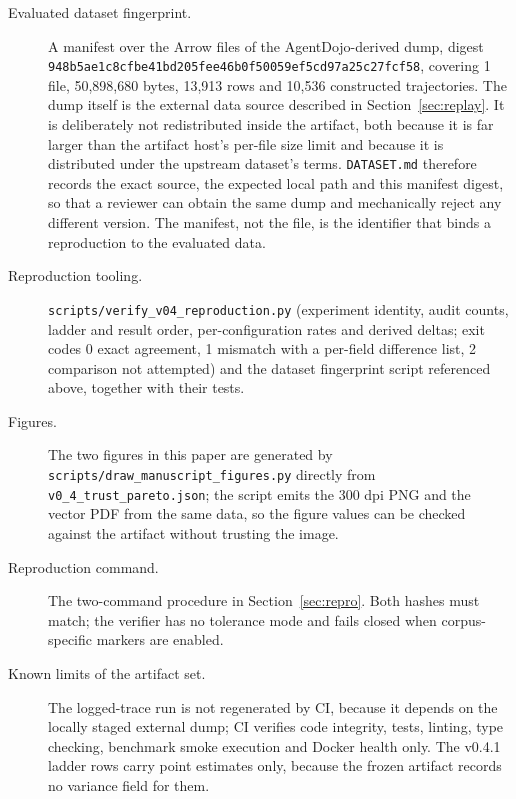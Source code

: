 \documentclass[letterpaper,twocolumn,10pt]{article}
\newcommand{\hb}{\allowbreak}
\begin{document}
\begin{description}
\item[Evaluated dataset fingerprint.] A manifest over the Arrow files of the
AgentDojo-derived dump, digest
\texttt{948b\hb 9432\hb 5ae1\hb c8cf\hb be41\hb bd20\hb 5fee\hb 46b0\hb f500\hb 2155\hb 59ef\hb 5cd9\hb 7a25\hb c27f\hb cf58\hb 0049},
covering 1 file, 50,898,680 bytes, 13,913 rows and 10,536 constructed
trajectories. The dump itself is the external data source described in
Section~\ref{sec:replay}. It is deliberately not redistributed inside the
artifact, both because it is far larger than the artifact host's per-file size
limit and because it is distributed under the upstream dataset's terms.
\texttt{DATASET.md} therefore records the exact source, the expected local
path and this manifest digest, so that a reviewer can obtain the same dump and
mechanically reject any different version. The manifest, not the file, is the
identifier that binds a reproduction to the evaluated data.

\item[Reproduction tooling.] \texttt{scripts/verify\_v04\_reproduction.py}
(experiment identity, audit counts, ladder and result order, per-configuration
rates and derived deltas; exit codes 0 exact agreement, 1 mismatch with a
per-field difference list, 2 comparison not attempted) and the dataset
fingerprint script referenced above, together with their tests.

\item[Figures.] The two figures in this paper are generated by
\texttt{scripts/draw\_manuscript\_figures.py} directly from
\texttt{v0\_4\_trust\_pareto.json}; the script emits the 300 dpi PNG and the
vector PDF from the same data, so the figure values can be checked against the
artifact without trusting the image.

\item[Reproduction command.] The two-command procedure in
Section~\ref{sec:repro}. Both hashes must match; the verifier has no tolerance
mode and fails closed when corpus-specific markers are enabled.

\item[Known limits of the artifact set.] The logged-trace run is not
regenerated by CI, because it depends on the locally staged external dump; CI
verifies code integrity, tests, linting, type checking, benchmark smoke
execution and Docker health only. The v0.4.1 ladder rows carry point estimates
only, because the frozen artifact records no variance field for them.

\end{description}

\cleardoublepage




\end{document}
